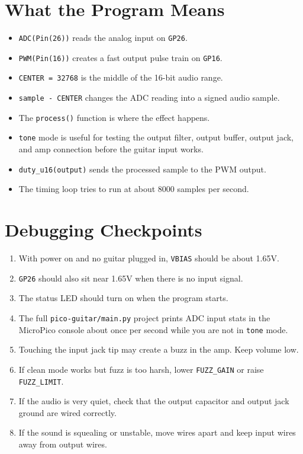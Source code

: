 \documentclass[11pt,letterpaper]{article}
\newcommand{\pin}[1]{\texttt{#1}}
\begin{document}
\section*{What the Program Means}
\begin{itemize}
    \item \texttt{ADC(Pin(26))} reads the analog input on \pin{GP26}.
    \item \texttt{PWM(Pin(16))} creates a fast output pulse train on \pin{GP16}.
    \item \texttt{CENTER = 32768} is the middle of the 16-bit audio range.
    \item \texttt{sample - CENTER} changes the ADC reading into a signed audio sample.
    \item The \texttt{process()} function is where the effect happens.
    \item \texttt{tone} mode is useful for testing the output filter, output buffer, output jack, and amp connection before the guitar input works.
    \item \texttt{duty\_u16(output)} sends the processed sample to the PWM output.
    \item The timing loop tries to run at about 8000 samples per second.
\end{itemize}

\section*{Debugging Checkpoints}
\begin{enumerate}
    \item With power on and no guitar plugged in, \texttt{VBIAS} should be about 1.65V.
    \item \pin{GP26} should also sit near 1.65V when there is no input signal.
    \item The status LED should turn on when the program starts.
    \item The full \texttt{pico-guitar/main.py} project prints ADC input stats in the MicroPico console about once per second while you are not in \texttt{tone} mode.
    \item Touching the input jack tip may create a buzz in the amp. Keep volume low.
    \item If clean mode works but fuzz is too harsh, lower \texttt{FUZZ\_GAIN} or raise \texttt{FUZZ\_LIMIT}.
    \item If the audio is very quiet, check that the output capacitor and output jack ground are wired correctly.
    \item If the sound is squealing or unstable, move wires apart and keep input wires away from output wires.
\end{enumerate}
\end{document}
